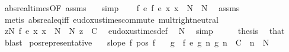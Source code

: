 \begin{isabellebody}
\ abs{\isacharunderscore}{\kern0pt}real{\isacharunderscore}{\kern0pt}times{\isacharbrackleft}{\kern0pt}OF\ assms{\isacharparenleft}{\kern0pt}{}{\isacharparenright}{\kern0pt}\ {\isacharasterisk}{\kern0pt}{\isacharparenleft}{\kern0pt}{}{\isacharparenright}{\kern0pt}{\isacharbrackright}{\kern0pt}\ \isamarkupfalse%
\ simp\isanewline
\ \ \isamarkupfalse%
\ {\isachardoublequoteopen}f\ {\isasymsim}\isactrlsub e\ {\isacharparenleft}{\kern0pt}f\ {\isacharasterisk}{\kern0pt}\isactrlsub e\ {\isacharparenleft}{\kern0pt}{\isasymlambda}x{\isachardot}{\kern0pt}\ x\ {\isacharplus}{\kern0pt}\ N{\isacharprime}{\kern0pt}\ {\isacharminus}{\kern0pt}\ N{\isacharparenright}{\kern0pt}{\isacharparenright}{\kern0pt}{\isachardoublequoteclose}\ \isamarkupfalse%
\ assms\ {\isacharasterisk}{\kern0pt}\ \isamarkupfalse%
\ {\isacharparenleft}{\kern0pt}metis\ abs{\isacharunderscore}{\kern0pt}real{\isacharunderscore}{\kern0pt}eq{\isacharunderscore}{\kern0pt}iff\ eudoxus{\isacharunderscore}{\kern0pt}times{\isacharunderscore}{\kern0pt}commute\ mult{\isachardot}{\kern0pt}right{\isacharunderscore}{\kern0pt}neutral{\isacharparenright}{\kern0pt}\isanewline
\ \ \isamarkupfalse%
\ \isamarkupfalse%
\ {\isachardoublequoteopen}{\isasymforall}z{\isasymge}N{\isachardot}{\kern0pt}\ {\isacharparenleft}{\kern0pt}f\ {\isacharasterisk}{\kern0pt}\isactrlsub e\ {\isacharparenleft}{\kern0pt}{\isasymlambda}x{\isachardot}{\kern0pt}\ x\ {\isacharplus}{\kern0pt}\ N{\isacharprime}{\kern0pt}\ {\isacharminus}{\kern0pt}\ N{\isacharparenright}{\kern0pt}{\isacharparenright}{\kern0pt}\ z\ {\isasymge}\ C{\isachardoublequoteclose}\ \isamarkupfalse%
\ eudoxus{\isacharunderscore}{\kern0pt}times{\isacharunderscore}{\kern0pt}def\ \isamarkupfalse%
\ N{\isacharprime}{\kern0pt}\ \isamarkupfalse%
\ simp\isanewline
\ \ \isamarkupfalse%
\ \isamarkupfalse%
\ {\isacharquery}{\kern0pt}thesis\ \isamarkupfalse%
\ that\ \isamarkupfalse%
\ blast\isanewline
{}\isamarkupfalse%
%
\endisatagproof
{\isafoldproof}%
%
\isadelimproof
\isanewline
%
\endisadelimproof
\isanewline
{}\isamarkupfalse%
\ pos{\isacharunderscore}{\kern0pt}representative{\isacharprime}{\kern0pt}{\isacharcolon}{\kern0pt}\isanewline
\ \ \ {\isachardoublequoteopen}slope\ f{\isachardoublequoteclose}\ {\isachardoublequoteopen}pos\ f{\isachardoublequoteclose}\isanewline
\ \ \ g\ \ {\isachardoublequoteopen}f\ {\isasymsim}\isactrlsub e\ g{\isachardoublequoteclose}\ {\isachardoublequoteopen}{\isasymAnd}n{\isachardot}{\kern0pt}\ g\ n\ {\isasymge}\ C\ {\isasymLongrightarrow}\ n\ {\isasymge}\ N{\isachardoublequoteclose}\isanewline

\end{isabellebody}

